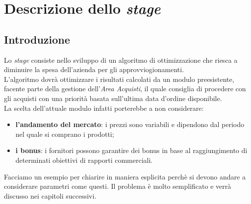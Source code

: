 \section{Descrizione dello \textit{stage}}

\subsection{Introduzione}
\label{sec:descrizione-stage-intro}

\noindent Lo \textit{stage} consiste nello sviluppo di un algoritmo di ottimizzazione che riesca a diminuire la spesa dell'azienda per gli approvviogionamenti.\\
L'algoritmo dovrà ottimizzare i risultati calcolati da un modulo preesistente, facente parte della gestione dell'\textit{Area Acquisti}, il quale
consiglia di procedere con gli acquisti con una priorità basata sull'ultima data d'ordine disponibile.\\
\noindent La scelta dell'attuale modulo infatti porterebbe a non considerare:
\begin{itemize}
    \item \textbf{l'andamento del mercato}: i prezzi sono variabili e dipendono dal periodo nel quale si comprano i prodotti;
    \item \textbf{i bonus}: i fornitori possono garantire dei bonus in base al raggiungimento di determinati obiettivi di rapporti commerciali.
\end{itemize}
\noindent Facciamo un esempio per chiarire in maniera esplicita perchè si devono andare a considerare parametri come questi. Il problema
è molto semplificato e verrà discusso nei capitoli successivi.\\

\renewcommand{\arraystretch}{1.2}

